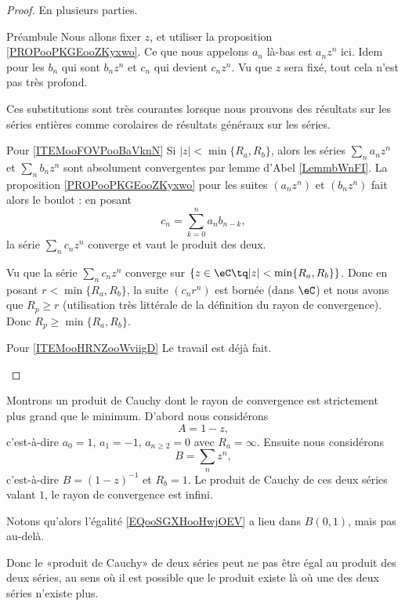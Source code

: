 \begin{proof}
	En plusieurs parties.
	\begin{subproof}
		\item[Préambule]
		Nous allons fixer \( z\), et utiliser la proposition \ref{PROPooPKGEooZKyxwo}. Ce que nous appelons \( a_n\) là-bas est \( a_nz^n\) ici. Idem pour les \( b_n\) qui sont \( b_nz^n\) et \( c_n\) qui devient \( c_nz^n\). Vu que \( z\) sera fixé, tout cela n'est pas très profond.

		Ces substitutions sont très courantes lorsque nous prouvons des résultats sur les séries entières comme corolaires de résultats généraux sur les séries.
		\item[Pour \ref{ITEMooFOVPooBaVknN}]
		Si \( | z |<\min\{ R_a,R_b \}\), alors les séries \( \sum_na_nz^n\) et \( \sum_nb_nz^n\) sont absolument convergentes par lemme d'Abel \ref{LemmbWnFI}. La proposition \ref{PROPooPKGEooZKyxwo} pour les suites \( (a_nz^n)\) et \( (b_nz^n)\) fait alors le boulot : en posant
		\begin{equation}
			c_n=\sum_{k=0}^na_nb_{n-k},
		\end{equation}
		la série \( \sum_nc_nz^n\) converge et vaut le produit des deux.

		Vu que la série \( \sum_nc_nz^n\) converge sur \( \{ z\in \eC\tq | z |<\min\{ R_a,R_b \} \}\). Donc en posant \( r<\min\{ R_a,R_b \}\), la suite \( (c_nr^n)\) est bornée (dans \( \eC\)) et nous avons que \( R_p\geq r\) (utilisation très littérale de la définition du rayon de convergence). Donc \( R_p\geq\min \{ R_a,R_b \}\).
		\item[Pour \ref{ITEMooHRNZooWviigD}]
		Le travail est déjà fait.
	\end{subproof}
\end{proof}

\begin{example}
	Montrons un produit de Cauchy dont le rayon de convergence est strictement plus grand que le minimum. D'abord nous considérons
	\begin{equation}
		A=1-z,
	\end{equation}
	c'est-à-dire \( a_0=1\), \( a_1=-1\), \( a_{n\geq 2}=0\) avec \( R_a=\infty\). Ensuite nous considérons
	\begin{equation}
		B=\sum_nz^n,
	\end{equation}
	c'est-à-dire \( B=(1-z)^{-1}\) et \( R_b=1\). Le produit de Cauchy de ces deux séries valant \( 1\), le rayon de convergence est infini.

	Notons qu'alors l'égalité \eqref{EQooSGXHooHwjOEV} a lieu dans \( B(0,1)\), mais pas au-delà.

	Donc le «produit de Cauchy» de deux séries peut ne pas être égal au produit des deux séries, au sens où il est possible que le produit existe là où une des deux séries n'existe plus.
\end{example}

